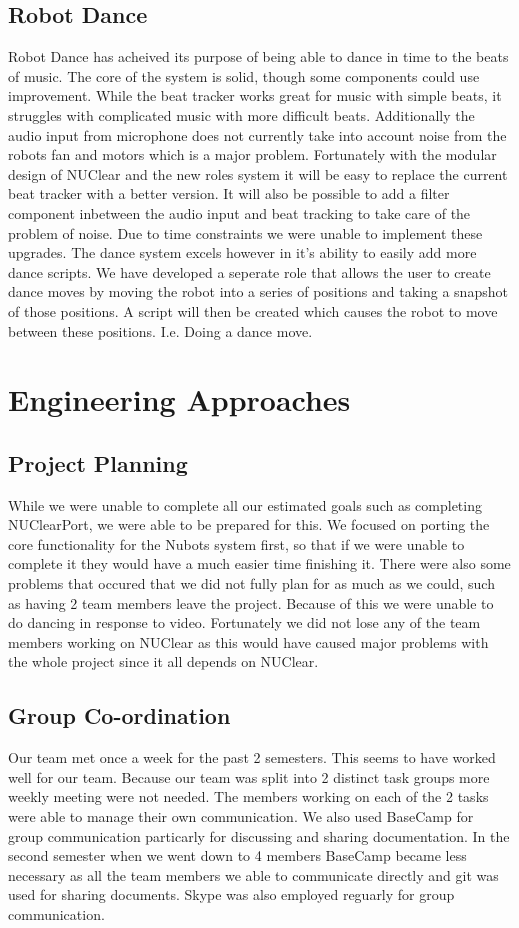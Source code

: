 \documentclass[a4paper]{article}
\begin{document}
	\subsection{Robot Dance}
			Robot Dance has acheived its purpose of being able to dance in time to the beats of music. The core of the system is solid, though some components could use improvement. While the beat tracker works great for music with simple beats, it struggles with complicated music with more difficult beats. Additionally the audio input from microphone does not currently take into account noise from the robots fan and motors which is a major problem. Fortunately with the modular design of NUClear and the new roles system it will be easy to replace the current beat tracker with a better version. It will also be possible to add a filter component inbetween the audio input and beat tracking to take care of the problem of noise. Due to time constraints we were unable to implement these upgrades. The dance system excels however in it's ability to easily add more dance scripts. We have developed a seperate role that allows the user to create dance moves by moving the robot into a series of positions and taking a snapshot of those positions. A script will then be created which causes the robot to move between these positions. I.e. Doing a dance move.
\section{Engineering Approaches}
	\subsection{Project Planning}
		While we were unable to complete all our estimated goals such as completing NUClearPort, we were able to be prepared for this. We focused on porting the core functionality for the Nubots system first, so that if we were unable to complete it they would have a much easier time finishing it. There were also some problems that occured that we did not fully plan for as much as we could, such as having 2 team members leave the project. Because of this we were unable to do dancing in response to video. Fortunately we did not lose any of the team members working on NUClear as this would have caused major problems with the whole project since it all depends on NUClear.
	\subsection{Group Co-ordination}
		Our team met once a week for the past 2 semesters. This seems to have worked well for our team. Because our team was split into 2 distinct task groups more weekly meeting were not needed. The members working on each of the 2 tasks were able to manage their own communication. We also used BaseCamp for group communication particarly for discussing and sharing documentation. In the second semester when we went down to 4 members BaseCamp became less necessary as all the team members we able to communicate directly and git was used for sharing documents. Skype was also employed reguarly for group communication.
\end{document}
